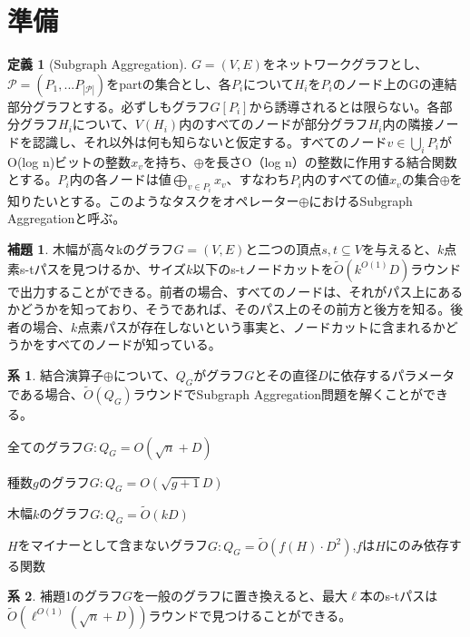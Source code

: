 \documentclass{jarticle}
\theoremstyle{definition}
\newtheorem{lemma}{補題}
\newtheorem{definition}{定義}
\newtheorem{corollary}{系}
\begin{document}
    
\section*{準備}

\begin{definition}[Subgraph Aggregation]
    $G=(V,E)$をネットワークグラフとし、$\mathcal{P} =(P_1,...P_{|\mathcal{P}|})$をpartの集合とし、各$P_i$について$H_i$を$P_i$のノード上のGの連結部分グラフとする。必ずしもグラフ$G[P_i]$から誘導されるとは限らない。各部分グラフ$H_i$について、$V(H_i)$内のすべてのノードが部分グラフ$H_i$内の隣接ノードを認識し、それ以外は何も知らないと仮定する。すべてのノード$v\in \bigcup_iP_i$がO(log n)ビットの整数$x_v$を持ち、$\oplus$を長さO（log n）の整数に作用する結合関数とする。$P_i$内の各ノードは値$\bigoplus_{v\in P_i}x_v$、すなわち$P_i$内のすべての値$x_v$の集合$\oplus$を知りたいとする。このようなタスクをオペレーター$\oplus$におけるSubgraph Aggregationと呼ぶ。
\end{definition}

\begin{lemma}
    木幅が高々kのグラフ$G=(V,E)$と二つの頂点$s,t\subseteq V$を与えると、$k$点素s-tパスを見つけるか、サイズ$k$以下のs-tノードカットを$\tilde{O}(k^{O(1)}D)$ラウンドで出力することができる。前者の場合、すべてのノードは、それがパス上にあるかどうかを知っており、そうであれば、そのパス上のその前方と後方を知る。後者の場合、$k$点素パスが存在しないという事実と、ノードカットに含まれるかどうかをすべてのノードが知っている。
\end{lemma}

\begin{corollary}
    結合演算子$\oplus$について、$Q_G$がグラフ$G$とその直径$D$に依存するパラメータである場合、$\tilde{O}(Q_G)$ラウンドでSubgraph Aggregation問題を解くことができる。
    \item 全てのグラフ$G:Q_G = O(\sqrt{n}+D)$
    \item 種数$g$のグラフ$G:Q_G=O(\sqrt{g+1}D)$
    \item 木幅$k$のグラフ$G:Q_G=\tilde{O}(kD)$
    \item $H$をマイナーとして含まないグラフ$G:Q_G=\tilde{O}(f(H)\cdot D^2)$,$f$は$H$にのみ依存する関数
\end{corollary}

\begin{corollary}
    補題1のグラフ$G$を一般のグラフに置き換えると、最大$\ell$本のs-tパスは$\tilde{O}(\ell^{O(1)}(\sqrt{n}+D))$ラウンドで見つけることができる。
\end{corollary}
\end{document}
